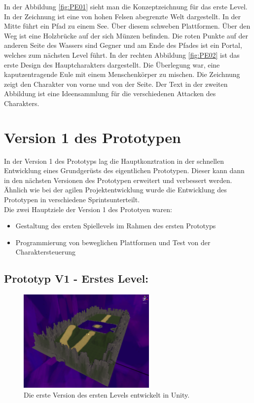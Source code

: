 In der Abbildung \ref{fig:PE01} sieht man die Konzeptzeichnung für das erste Level. In der Zeichnung ist eine von hohen Felsen abegrenzte Welt dargestellt. In der Mitte führt ein Pfad zu einem See. Über diesem schweben Plattformen. Über den Weg ist eine Holzbrücke auf der sich Münzen befinden. Die roten Punkte auf der anderen Seite des Wassers sind Gegner und am Ende des Pfades ist ein Portal, welches zum nächsten Level führt. In der rechten Abbildung \ref{fig:PE02} ist das erste Design des Hauptcharakters dargestellt. Die Überlegung war, eine kaputzentragende Eule mit einem Menschenkörper zu mischen. Die Zeichnung zeigt den Charakter von vorne und von der Seite. Der Text in der zweiten Abbildung ist eine Ideensammlung für die verschiedenen Attacken des Charakters. 
\pagebreak


\section{Version 1 des Prototypen}
In der Version 1 des Prototyps lag die Hauptkonztration in der schnellen Entwicklung eines Grundgerüsts des eigentlichen Prototypen. Dieser kann dann in den nächsten Versionen des Prototypen erweitert und verbessert werden. Ähnlich wie bei der agilen Projektentwicklung wurde die Entwicklung des Prototypen in verschiedene \glqq Sprints\grqq\space unterteilt. \\

Die zwei Hauptziele der Version 1 des Prototyen waren: 
\begin{itemize}
  \item Gestaltung des ersten Spiellevels im Rahmen des ersten Prototyps
  \item Programmierung von beweglichen Plattformen und Test von der Charaktersteuerung
\end{itemize}

\subsection{Prototyp V1 - Erstes Level:}

\begin{figure}[h]
  \centering
  \includegraphics*[width=0.6\textwidth]{chapters/04/images/V1/V1.png}
  \caption{Die erste Version des ersten Levels entwickelt in Unity.}
  \label{fig:PE03}
\end{figure}

